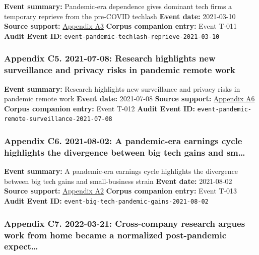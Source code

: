 \documentclass[
  american,
  11pt,
  letterpaper,
]{article}
\begin{document}
\textbf{Event summary:} Pandemic-era dependence gives dominant tech
firms a temporary reprieve from the pre-COVID techlash \textbf{Event
date:} 2021-03-10 \textbf{Source support:}
\hyperref[ch-03-appendix-a3-pandemic-provides-a-techlash-reprieve]{Appendix
A3} \textbf{Corpus companion entry:} Event T-011 \textbf{Audit Event
ID:} \texttt{event-pandemic-techlash-reprieve-2021-03-10}

\subsubsection{Appendix C5. 2021-07-08: Research highlights new
surveillance and privacy risks in pandemic remote
work}\label{ch-03-appendix-c5-2021-07-08-research-highlights-new-surveillance-and-privacy-risks-in-pandemic-remote-work}

\textbf{Event summary:} Research highlights new surveillance and privacy
risks in pandemic remote work \textbf{Event date:} 2021-07-08
\textbf{Source support:}
\hyperref[ch-03-appendix-a6-remote-working-pre-and-post-covid-19-an-analysis-of-new-threats-and-risks-to-security-and-privacy]{Appendix
A6} \textbf{Corpus companion entry:} Event T-012 \textbf{Audit Event
ID:} \texttt{event-pandemic-remote-surveillance-2021-07-08}

\subsubsection{Appendix C6. 2021-08-02: A pandemic-era earnings cycle
highlights the divergence between big tech gains and
sm\ldots{}}\label{ch-03-appendix-c6-2021-08-02-a-pandemic-era-earnings-cycle-highlights-the-divergence-between-big-tech-gains-and-small-business-strain}

\textbf{Event summary:} A pandemic-era earnings cycle highlights the
divergence between big tech gains and small-business strain
\textbf{Event date:} 2021-08-02 \textbf{Source support:}
\hyperref[ch-03-appendix-a2-big-tech-announces-striking-pandemic-gains-as-small-businesses-strain-to-find-their-footing]{Appendix
A2} \textbf{Corpus companion entry:} Event T-013 \textbf{Audit Event
ID:} \texttt{event-big-tech-pandemic-gains-2021-08-02}

\subsubsection{Appendix C7. 2022-03-21: Cross-company research argues
work from home became a normalized post-pandemic
expect\ldots{}}\label{ch-03-appendix-c7-2022-03-21-cross-company-research-argues-work-from-home-became-a-normalized-post-pandemic-expectation}
\end{document}

